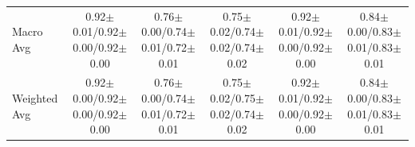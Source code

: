 \begin{table}[!t]
{\begin{tabular}{l|cccc|cccc|cccc|cccc|cccc}
Macro Avg & \multicolumn{4}{c|}{0.92$\pm$0.01/0.92$\pm$0.00/0.92$\pm$0.00} & \multicolumn{4}{c|}{0.76$\pm$0.00/0.74$\pm$0.01/0.72$\pm$0.01} & \multicolumn{4}{c|}{0.75$\pm$0.02/0.74$\pm$0.02/0.74$\pm$0.02} & \multicolumn{4}{c|}{0.92$\pm$0.01/0.92$\pm$0.00/0.92$\pm$0.00} & \multicolumn{4}{c}{0.84$\pm$0.00/0.83$\pm$0.01/0.83$\pm$0.01} \\
Weighted Avg & \multicolumn{4}{c|}{0.92$\pm$0.00/0.92$\pm$0.00/0.92$\pm$0.00} & \multicolumn{4}{c|}{0.76$\pm$0.00/0.74$\pm$0.01/0.72$\pm$0.01} & \multicolumn{4}{c|}{0.75$\pm$0.02/0.75$\pm$0.02/0.74$\pm$0.02} & \multicolumn{4}{c|}{0.92$\pm$0.01/0.92$\pm$0.00/0.92$\pm$0.00} & \multicolumn{4}{c}{0.84$\pm$0.00/0.83$\pm$0.01/0.83$\pm$0.01} \\
\bottomrule
\end{tabular}}
\end{table}
